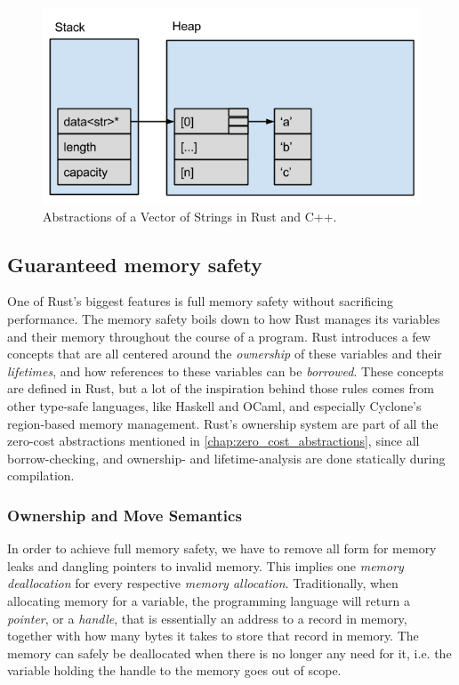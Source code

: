 \begin{figure}[tb]
  \begin{center}
    \includegraphics[scale=0.5]{figures/cpp_abstractions}
  \end{center}
  \caption{Abstractions of a Vector of Strings in Rust and C++.}
  \label{fig:cpp_abstractions}
\end{figure}

\subsection{Guaranteed memory safety}
\label{sec:guaranteed_memory_safety}

One of Rust's biggest features is full memory safety \cite{web:rust_book_unsafe} without sacrificing performance.
The memory safety boils down to how Rust manages its variables and their memory throughout the course of a program.
Rust introduces a few concepts that are all centered around the \emph{ownership} of these variables and their \emph{lifetimes}, and how references to these variables can be \emph{borrowed}.
These concepts are defined in Rust, but a lot of the inspiration behind those rules comes from other type-safe languages, like Haskell and OCaml, and especially Cyclone's \cite{Grossman2002,Swamy2006} region-based memory management.
Rust's ownership system are part of all the zero-cost abstractions mentioned in \autoref{chap:zero_cost_abstractions}, since all borrow-checking, and ownership- and lifetime-analysis are done statically during compilation.

\subsubsection{Ownership and Move Semantics}
\label{sec:back:rust:own}

In order to achieve full memory safety, we have to remove all form for memory leaks and dangling pointers to invalid memory.
This implies one \emph{memory deallocation} for every respective \emph{memory allocation}.
Traditionally, when allocating memory for a variable, the programming language will return a \emph{pointer},  or a \emph{handle}, that is essentially an address to a record in memory, together with how many bytes it takes to store that record in memory.
The memory can safely be deallocated when there is no longer any need for it, i.e. the variable holding the handle to the memory goes out of scope.

